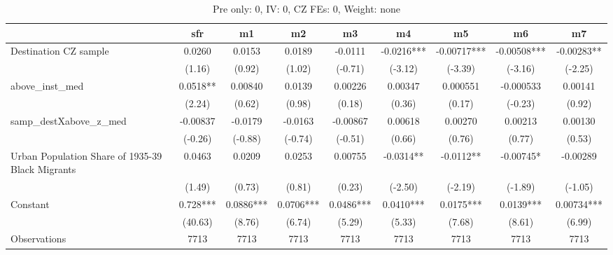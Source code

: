 \begin{table}[htbp]\centering
\def\sym#1{\ifmmode^{#1}\else\(^{#1}\)\fi}
\caption{Pre only: 0, IV: 0, CZ FEs: 0, Weight: none}
\begin{tabular}{l*{8}{c}}
\toprule
                    &\multicolumn{1}{c}{sfr}&\multicolumn{1}{c}{m1}&\multicolumn{1}{c}{m2}&\multicolumn{1}{c}{m3}&\multicolumn{1}{c}{m4}&\multicolumn{1}{c}{m5}&\multicolumn{1}{c}{m6}&\multicolumn{1}{c}{m7}\\
\midrule
Destination CZ sample&      0.0260   &      0.0153   &      0.0189   &     -0.0111   &     -0.0216***&    -0.00717***&    -0.00508***&    -0.00283** \\
                    &      (1.16)   &      (0.92)   &      (1.02)   &     (-0.71)   &     (-3.12)   &     (-3.39)   &     (-3.16)   &     (-2.25)   \\
\addlinespace
above\_inst\_med      &      0.0518** &     0.00840   &      0.0139   &     0.00226   &     0.00347   &    0.000551   &   -0.000533   &     0.00141   \\
                    &      (2.24)   &      (0.62)   &      (0.98)   &      (0.18)   &      (0.36)   &      (0.17)   &     (-0.23)   &      (0.92)   \\
\addlinespace
samp\_destXabove\_z\_med&    -0.00837   &     -0.0179   &     -0.0163   &    -0.00867   &     0.00618   &     0.00270   &     0.00213   &     0.00130   \\
                    &     (-0.26)   &     (-0.88)   &     (-0.74)   &     (-0.51)   &      (0.66)   &      (0.76)   &      (0.77)   &      (0.53)   \\
\addlinespace
Urban Population Share of 1935-39 Black Migrants&      0.0463   &      0.0209   &      0.0253   &     0.00755   &     -0.0314** &     -0.0112** &    -0.00745*  &    -0.00289   \\
                    &      (1.49)   &      (0.73)   &      (0.81)   &      (0.23)   &     (-2.50)   &     (-2.19)   &     (-1.89)   &     (-1.05)   \\
\addlinespace
Constant            &       0.728***&      0.0886***&      0.0706***&      0.0486***&      0.0410***&      0.0175***&      0.0139***&     0.00734***\\
                    &     (40.63)   &      (8.76)   &      (6.74)   &      (5.29)   &      (5.33)   &      (7.68)   &      (8.61)   &      (6.99)   \\
\midrule
Observations        &        7713   &        7713   &        7713   &        7713   &        7713   &        7713   &        7713   &        7713   \\

\end{tabular}
\end{table}
